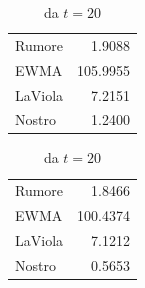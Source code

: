 \begin{table}
    \caption{Posizione: Errore quadrato medio}
    \label{tab:peqm}
    \centering
    \begin{subtable}{.49\textwidth}
        \caption{da $t=0$}
        \centering
        \begin{tabular}{l r}
            Rumore &    1.9088 \\
            EWMA &    105.9955 \\
            LaViola &   7.2151 \\
            Nostro &    1.2400 \\
        \end{tabular}
    \end{subtable}
    \hfill
    \begin{subtable}{.49\textwidth}
        \caption{ da $t=20$ }
        \label{tab:peqmb}
        \centering
        \begin{tabular}{l r}
            Rumore &   1.8466 \\
            EWMA &   100.4374 \\
            LaViola &  7.1212 \\
            Nostro &   0.5653 \\
        \end{tabular}
    \end{subtable}
\end{table}


